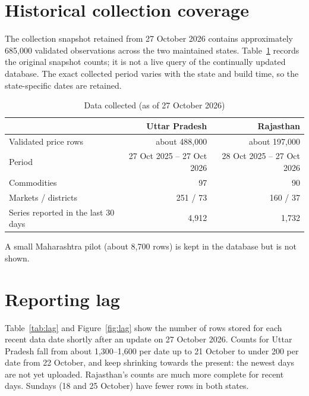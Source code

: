 \documentclass[12pt,a4paper,oneside]{report}
\numberwithin{equation}{chapter}
\numberwithin{figure}{chapter}
\numberwithin{table}{chapter}
\theoremstyle{definition}
\begin{document}
\section{Historical collection coverage}
The collection snapshot retained from 27 October 2026 contains approximately 685,000 validated observations across the two maintained states. Table~\ref{tab:data} records the original snapshot counts; it is not a live query of the continually updated database. The exact collected period varies with the state and build time, so the state-specific dates are retained.

\begin{table}[H]
\centering
\caption{Data collected (as of 27 October 2026)}
\label{tab:data}
\small
\begin{tabular}{@{}lrr@{}}
\toprule
& Uttar Pradesh & Rajasthan \\
\midrule
Validated price rows & about 488{,}000 & about 197{,}000 \\
Period & 27 Oct 2025 -- 27 Oct 2026 & 28 Oct 2025 -- 27 Oct 2026 \\
Commodities & 97 & 90 \\
Markets / districts & 251 / 73 & 160 / 37 \\
Series reported in the last 30 days & 4{,}912 & 1{,}732 \\
\bottomrule
\end{tabular}
\end{table}
A small Maharashtra pilot (about 8{,}700 rows) is kept in the database but is not shown.

\section{Reporting lag}
Table~\ref{tab:lag} and Figure~\ref{fig:lag} show the number of rows stored for each recent data date shortly after an update on 27 October 2026. Counts for Uttar Pradesh fall from about 1,300--1,600 per date up to 21 October to under 200 per date from 22 October, and keep shrinking towards the present: the newest days are not yet uploaded. Rajasthan's counts are much more complete for recent days. Sundays (18 and 25 October) have fewer rows in both states.
\end{document}
